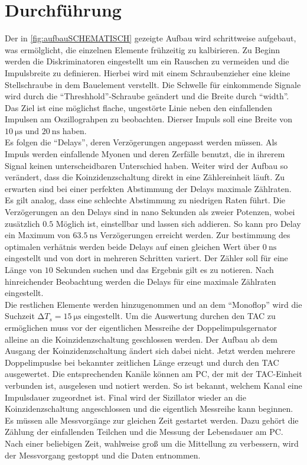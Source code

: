 \section{Durchführung}
Der in \ref{fig:aufbauSCHEMATISCH} gezeigte Aufbau wird schrittweise aufgebaut, was ermölglicht, die einzelnen Elemente
frühzeitig zu kalbirieren. Zu Beginn werden die Diskriminatoren eingestellt um ein Rauschen zu vermeiden und die Impulsbreite zu definieren.
Hierbei wird mit einem Schraubenzieher eine kleine Stellschraube in dem Bauelement verstellt. Die Schwelle für einkommende Signale
wird durch die \enquote{Threshhold}-Schraube geändert und die Breite durch \enquote{width}. Das Ziel ist eine möglichst flache, ungestörte Linie 
neben den einfallenden Impulsen am Oszillograhpen zu beobachten. Dierser Impuls soll eine Breite von $\SI{10}{\micro\second}$ und $\SI{20}{\nano\second}$ haben.
\\
\newline
Es folgen die \enquote{Delays}, deren Verzögerungen angepasst werden müssen. Als Impuls werden einfallende Myonen und deren Zerfälle 
benutzt, die in ihrerem Signal keinen unterscheidbaren Unterschied haben. Weiter wird der Aufbau so verändert, dass die Koinzidenzschaltung direkt in eine Zählereinheit läuft. 
Zu erwarten sind bei einer perfekten Abstimmung der Delays maximale Zählraten. Es gilt analog, dass eine schlechte Abstimmung zu niedrigen Raten führt. 
Die Verzögerungen an den Delays sind in nano Sekunden als zweier Potenzen, wobei zusätzlich $0.5$ Möglich ist, einstellbar und lassen sich addieren. So kann pro Delay
ein Maximum von $\SI{63.5}{\nano\second}$ Verzögerungen erreicht werden. Zur bestimmung des optimalen verhätnis werden beide Delays auf einen gleichen Wert über $\SI{0}{\nano\second}$ eingestellt und von dort 
in mehreren Schritten variert. Der Zähler soll für eine Länge von $10$ Sekunden suchen und das Ergebnis gilt es zu notieren.
Nach hinreichender Beobachtung werden die Delays für eine maximale Zählraten eingestellt.
\\
\newline
Die restlichen Elemente werden hinzugenommen und an dem \enquote{Monoflop} wird die Suchzeit $\increment T_s = \SI{15}{\micro\second}$ eingestellt. 
Um die Auswertung durchen den TAC zu ermöglichen muss vor der eigentlichen Messreihe der Doppelimpulsgernator alleine an die Koinzidenzschaltung
geschlossen werden. Der Aufbau ab dem Ausgang der Koinzidenzschaltung ändert sich dabei nicht. 
Jetzt werden mehrere Doppelimpuslse bei bekannter zeitlichen Länge erzeugt und durch den TAC ausgewertet. Die entsprechenden Kanäle können am PC, der mit der TAC-Einheit verbunden ist, 
ausgelesen und notiert werden. So ist bekannt, welchem Kanal eine Impulsdauer zugeordnet ist. 
Final wird der Sizillator wieder an die Koinzidenzschaltung angeschlossen und die eigentlich Messreihe kann beginnen. 
Es müssen alle Messvorgänge zur gleichen Zeit gestartet werden. Dazu gehört die Zählung der einfallenden Teilchen und die Messung der Lebensdauer am PC.
Nach einer beliebigen Zeit, wahlweise groß um die Mittellung zu verbessern, wird der Messvorgang gestoppt und die Daten entnommen.